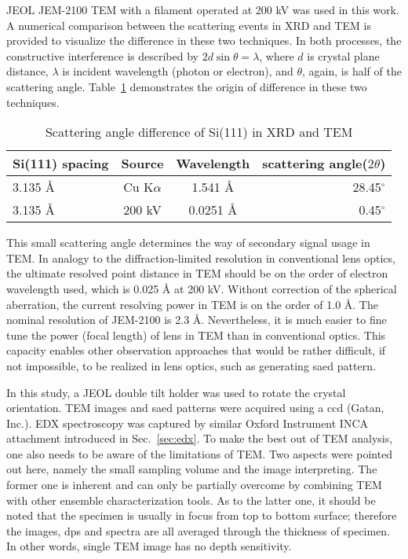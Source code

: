 JEOL JEM-2100 TEM with a  filament operated at 200 kV was used in this work. A numerical comparison between the scattering events in XRD and TEM is provided to visualize the difference in these two techniques. In both processes, the constructive interference is described by $2d\sin\theta = \lambda$, where $d$ is crystal plane distance, $\lambda$ is incident wavelength (photon or electron), and $\theta$, again, is half of the scattering angle. Table~\ref{tab:ch2tem} demonstrates the origin of difference in these two techniques.
\begin{table}[htb]
\centering
\caption{Scattering angle difference of Si(111) in XRD and TEM}\label{tab:ch2tem}
\begin{tabular}{lccr}
\toprule
Si(111) spacing & Source & Wavelength & scattering angle($2\theta$) \\
\midrule
3.135 \AA & Cu K$\alpha$ & 1.541 \AA & 28.45$^\circ$  \\
3.135 \AA & 200 kV & 0.0251 \si{\angstrom} & 0.45$^\circ$  \\
\bottomrule
\end{tabular}
\end{table}
This small scattering angle determines the way of secondary signal usage in TEM. In analogy to the diffraction-limited resolution in conventional lens optics, the ultimate resolved point distance in TEM should be on the order of electron wavelength used, which is 0.025 \si{\angstrom} at 200 kV. Without correction of the spherical aberration, the current resolving power in TEM is on the order of 1.0 \si{\angstrom}. The nominal resolution of JEM-2100 is 2.3 \si{\angstrom}. Nevertheless, it is much easier to fine tune the power (focal length) of lens in TEM than in conventional optics. This capacity enables other observation approaches that would be rather difficult, if not impossible, to be realized in lens optics, such as generating \gls{saed} pattern. 

In this study, a JEOL double tilt holder was used to rotate the crystal orientation. TEM images and \gls{saed} patterns were acquired using a \gls{ccd} (Gatan, Inc.). EDX spectroscopy was captured by similar Oxford Instrument INCA attachment introduced in Sec.~\ref{sec:edx}. To make the best out of TEM analysis, one also needs to be aware of the limitations of TEM. Two aspects were pointed out here, namely the small sampling volume and the image interpreting. The former one is inherent and can only be partially overcome by combining TEM with other ensemble characterization tools. As to the latter one, it should be noted that the specimen is usually in focus from top to bottom surface; therefore the images, \glspl{dp} and spectra are all averaged through the thickness of specimen. In other words, single TEM image has no depth sensitivity.\cite{Williams2009}  

